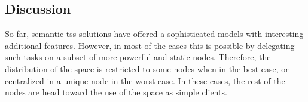 




\subsection{Discussion}






%




So far, semantic \aclp{ts} solutions have offered a sophisticated models with interesting additional features.
However, in most of the cases this is possible by delegating such tasks on a subset of more powerful and static nodes.
Therefore, the distribution of the space is restricted to some nodes when in the best case, or centralized in a unique node in the worst case.
In these cases, the rest of the nodes are head toward the use of the space as simple clients.


